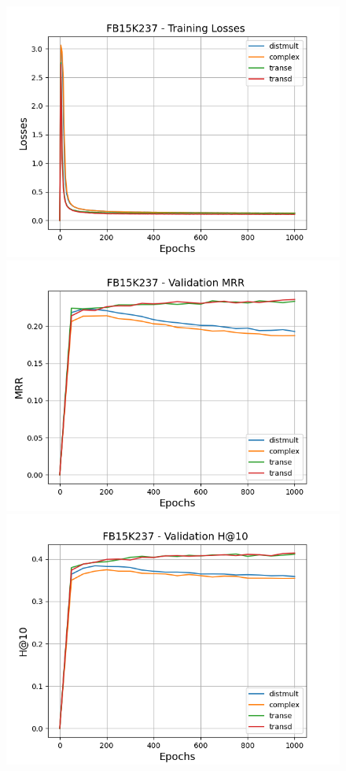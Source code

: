 \begin{figure}
    \centering
    \begin{minipage}{.3\textwidth}
      \centering
      \includegraphics[width=0.9\linewidth]{figures/results/pretrain/fb15k237/pretrain_fb15k237_losses.png}
    \end{minipage}%
    \begin{minipage}{.3\textwidth}
      \centering
      \includegraphics[width=0.9\linewidth]{figures/results/pretrain/fb15k237/pretrain_fb15k237_mrrs.png}
    \end{minipage}
    \begin{minipage}{.3\textwidth}
      \centering
      \includegraphics[width=0.9\linewidth]{figures/results/pretrain/fb15k237/pretrain_fb15k237_hit10s.png}

\end{minipage}
\end{figure}
